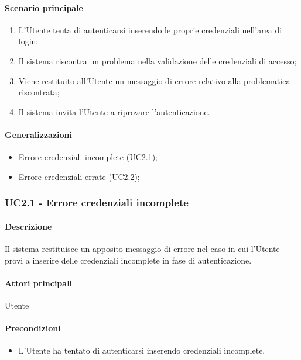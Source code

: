 \paragraph*{Scenario principale}
\begin{enumerate}
  \item L'Utente tenta di autenticarsi inserendo le proprie credenziali nell'area di login;
  \item Il sistema riscontra un problema nella validazione delle credenziali di accesso;
  \item Viene restituito all'Utente un messaggio di errore relativo alla problematica riscontrata;
  \item Il sistema invita l'Utente a riprovare l'autenticazione.
\end{enumerate}

\paragraph*{Generalizzazioni}
\begin{itemize}
  \item Errore credenziali incomplete (\hyperref[UC2point1]{UC2.1});
  \item Errore credenziali errate (\hyperref[UC2point2]{UC2.2});
\end{itemize}


\subsubsection{UC2.1 - Errore credenziali incomplete}\label{UC2point1}
\paragraph*{Descrizione}
Il sistema restituisce un apposito messaggio di errore nel caso in cui l'Utente provi a inserire delle credenziali incomplete in fase di autenticazione.

\paragraph*{Attori principali}
Utente

\paragraph*{Precondizioni}
\begin{itemize}
  \item L'Utente ha tentato di autenticarsi inserendo credenziali incomplete.  
\end{itemize}

